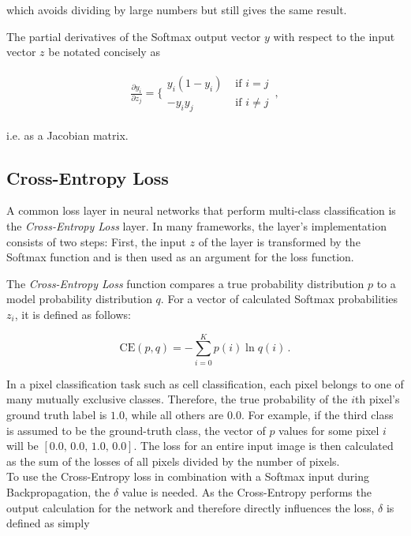 \noindent which avoids dividing by large numbers but still gives the same result. \cite[p. 81]{deeplearning_book}

The partial derivatives of the Softmax output vector $y$ with respect to the input vector $z$ be notated concisely as

\begin {align}
	\frac{\partial y_i}{\partial z_j} = \bigg \{ \begin {array}{ll}
								y_i(1 - y_i)& \text{ if } i = j \\
								-y_i y_j& \text{ if } i \neq j
							\end{array} \,,
	\label{eq:softmax_deriv}
\end {align}

i.e. as a Jacobian matrix. \cite[]{bishop_pattern}


		\subsection{Cross-Entropy Loss}
\label{subsec:cross_ent}

A common loss layer in neural networks that perform multi-class classification is the \textit{Cross-Entropy Loss} layer. In many frameworks, the layer's implementation consists of two steps: First, the input $z$ of the layer is transformed by the Softmax function and is then used as an argument for the loss function.

The \textit{Cross-Entropy Loss} function compares a true probability distribution $p$ to a model probability distribution $q$. For a vector of calculated Softmax probabilities $z_i$, it is defined as follows:

\[ \text{CE}(p, q) = -\sum \limits_{i = 0}^{K} p(i) \ln q(i) \,. \]

\noindent In a pixel classification task such as cell classification, each pixel belongs to one of many mutually exclusive classes. Therefore, the true probability of the $i$th pixel's ground truth label is $1.0$, while all others are $0.0$. For example, if the third class is assumed to be the ground-truth class, the vector of $p$ values for some pixel $i$ will be $[0.0,\, 0.0,\, 1.0,\, 0.0]$. The loss for an entire input image is then calculated as the sum of the losses of all pixels divided by the number of pixels.\\

\noindent To use the Cross-Entropy loss in combination with a Softmax input during Backpropagation, the $\delta$ value is needed. As the Cross-Entropy performs the output calculation for the network and therefore directly influences the loss, $\delta$ is defined as simply

